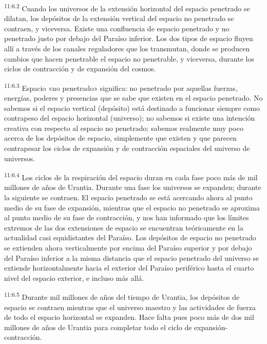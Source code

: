\par
\textsuperscript{11:6.2} Cuando los universos de la extensión horizontal del espacio penetrado se dilatan, los depósitos de la extensión vertical del espacio no penetrado se contraen, y viceversa. Existe una confluencia de espacio penetrado y no penetrado justo por debajo del Paraíso inferior. Los dos tipos de espacio fluyen allí a través de los canales reguladores que los transmutan, donde se producen cambios que hacen penetrable el espacio no penetrable, y viceversa, durante los ciclos de contracción y de expansión del cosmos.

\par
\textsuperscript{11:6.3} Espacio «no penetrado» significa: no penetrado por aquellas fuerzas, energías, poderes y presencias que se sabe que existen en el espacio penetrado. No sabemos si el espacio vertical (depósito) está destinado a funcionar siempre como contrapeso del espacio horizontal (universo); no sabemos si existe una intención creativa con respecto al espacio no penetrado; sabemos realmente muy poco acerca de los depósitos de espacio, simplemente que existen y que parecen contrapesar los ciclos de expansión y de contracción espaciales del universo de universos.

\par
\textsuperscript{11:6.4} Los ciclos de la respiración del espacio duran en cada fase poco más de mil millones de años de Urantia. Durante una fase los universos se expanden; durante la siguiente se contraen. El espacio penetrado se está acercando ahora al punto medio de su fase de expansión, mientras que el espacio no penetrado se aproxima al punto medio de su fase de contracción, y nos han informado que los límites extremos de las dos extensiones de espacio se encuentran teóricamente en la actualidad casi equidistantes del Paraíso. Los depósitos de espacio no penetrado se extienden ahora verticalmente por encima del Paraíso superior y por debajo del Paraíso inferior a la misma distancia que el espacio penetrado del universo se extiende horizontalmente hacia el exterior del Paraíso periférico hasta el cuarto nivel del espacio exterior, e incluso más allá.

\par
\textsuperscript{11:6.5} Durante mil millones de años del tiempo de Urantia, los depósitos de espacio se contraen mientras que el universo maestro y las actividades de fuerza de todo el espacio horizontal se expanden. Hace falta pues poco más de dos mil millones de años de Urantia para completar todo el ciclo de expansión-contracción.


